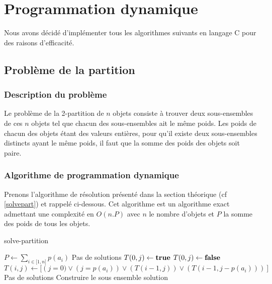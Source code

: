 
\section{Programmation dynamique}
Nous avons décidé d'implémenter tous les algorithmes suivants en langage C pour des raisons d'efficacité.

\subsection{Problème de la partition}

\subsubsection{Description du problème}
Le problème de la 2-partition de $n$ objets consiste à trouver deux sous-ensembles de ces $n$ objets tel que chacun des sous-ensembles ait le même poids. Les poids de chacun des objets étant des valeurs entières, pour qu’il existe deux sous-ensembles distincts ayant le même poids, il faut que la somme des poids des objets soit paire.

\subsubsection{Algorithme de programmation dynamique}
Prenons l'algorithme de résolution présenté dans la section théorique (cf \ref{solvepart}) et rappelé ci-dessous. Cet algorithme est un algorithme exact admettant une complexité en $O(n.P)$ avec $n$ le nombre d'objets et $P$ la somme des poids de tous les objets.
\begin{algorithm}[H]
	\caption{solve-partition}
	\begin{algorithmic}[1]
		\STATE $P \leftarrow \sum_{i \in \mathbb{[}1, n \mathbb{]}} p(a_i)$
			\STATE Pas de solutions
		\ELSE
					\STATE $T(0, j) \leftarrow \textbf{true}{}$
				\ELSE
					\STATE $T(0, j) \leftarrow \textbf{false}{}$
				\ENDIF
			\ENDFOR
					\STATE $T(i, j) \leftarrow [\left (j = 0) \vee (j = p(a_i)) \vee (T(i-1, j)) \vee (T(i-1, j-p(a_i))) \right]$
				\ENDFOR
			\ENDFOR
				\STATE Pas de solutions
			\ELSE
				\STATE Construire le sous ensemble solution
			\ENDIF
		\ENDIF
	\end{algorithmic}
\end{algorithm}

